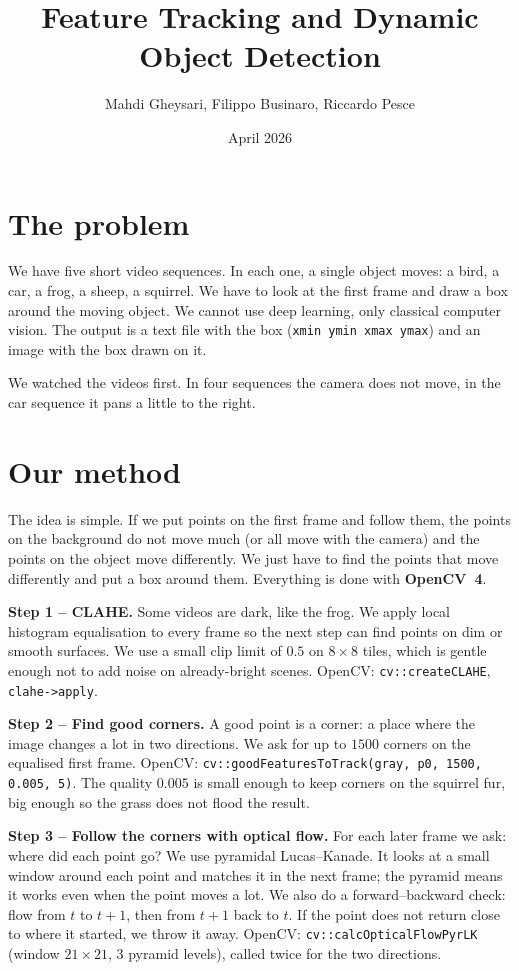 \documentclass[10pt,a4paper]{article}
\title{\vspace{-2em}Feature Tracking and Dynamic Object Detection}
\author{Mahdi Gheysari, Filippo Businaro, Riccardo Pesce}
\date{\vspace{-1em}April 2026}
\begin{document}
\maketitle
\vspace{-2em}

\section{The problem}

We have five short video sequences. In each one, a single object
moves: a bird, a car, a frog, a sheep, a squirrel. We have to
look at the first frame and draw a box around the moving object.
We cannot use deep learning, only classical computer vision. The
output is a text file with the box (\texttt{xmin ymin xmax ymax})
and an image with the box drawn on it.

We watched the videos first. In four sequences the camera does
not move, in the car sequence it pans a little to the right.

\section{Our method}

The idea is simple. If we put points on the first frame and
follow them, the points on the background do not move much (or
all move with the camera) and the points on the object move
differently. We just have to find the points that move
differently and put a box around them. Everything is done with
\textbf{OpenCV~4}.

\textbf{Step 1 -- CLAHE.} Some videos are dark, like the frog.
We apply local histogram equalisation to every frame so the next
step can find points on dim or smooth surfaces. We use a small
clip limit of $0.5$ on $8\times8$ tiles, which is gentle enough
not to add noise on already-bright scenes.
OpenCV: \texttt{cv::createCLAHE}, \texttt{clahe->apply}.

\textbf{Step 2 -- Find good corners.} A good point is a corner:
a place where the image changes a lot in two directions. We ask
for up to $1500$ corners on the equalised first frame.
OpenCV: \texttt{cv::goodFeaturesToTrack(gray, p0, 1500, 0.005, 5)}.
The quality $0.005$ is small enough to keep corners on the
squirrel fur, big enough so the grass does not flood the result.

\textbf{Step 3 -- Follow the corners with optical flow.} For each
later frame we ask: where did each point go? We use pyramidal
Lucas--Kanade. It looks at a small window around each point and
matches it in the next frame; the pyramid means it works even
when the point moves a lot. We also do a forward--backward check:
flow from $t$ to $t{+}1$, then from $t{+}1$ back to $t$. If the
point does not return close to where it started, we throw it
away.
OpenCV: \texttt{cv::calcOpticalFlowPyrLK} (window $21\times21$, $3$
pyramid levels), called twice for the two directions.
\end{document}
